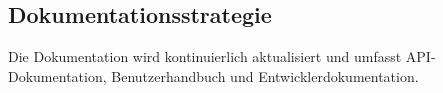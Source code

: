 \subsection{Dokumentationsstrategie}
Die Dokumentation wird kontinuierlich aktualisiert und umfasst API-Dokumentation, Benutzerhandbuch und Entwicklerdokumentation.

